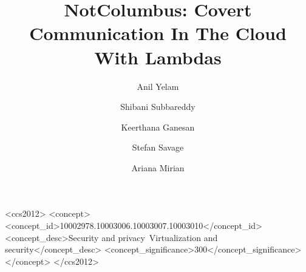 \documentclass[sigconf,review]{acmart}
\begin{document}
\sloppy

\title[NotColumbus: Covert Communication In The Cloud With Lambdas]
{NotColumbus: Covert Communication In The Cloud With Lambdas} %

\author{Anil Yelam}

\author{Shibani Subbareddy}

\author{Keerthana Ganesan}
\authornotemark[1]

\author{Stefan Savage}

\author{Ariana Mirian}






\begin{CCSXML}
<ccs2012>
<concept>
<concept_id>10002978.10003006.10003007.10003010</concept_id>
<concept_desc>Security and privacy~Virtualization and security</concept_desc>
<concept_significance>300</concept_significance>
</concept>
</ccs2012>
\end{CCSXML}
\end{document}
